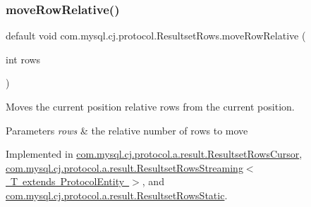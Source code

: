 \mbox{\label{interfacecom_1_1mysql_1_1cj_1_1protocol_1_1_resultset_rows_a81d7635ad38c59a3160e3edc46327bac}} 
\subsubsection{\texorpdfstring{move\+Row\+Relative()}{moveRowRelative()}}
{\footnotesize\ttfamily default void com.\+mysql.\+cj.\+protocol.\+Resultset\+Rows.\+move\+Row\+Relative (\begin{DoxyParamCaption}\item[{int}]{rows }\end{DoxyParamCaption})}

Moves the current position relative \textquotesingle{}rows\textquotesingle{} from the current position.


\begin{DoxyParams}{Parameters}
{\em rows} & the relative number of rows to move \\
\hline
\end{DoxyParams}


Implemented in \mbox{\hyperlink{classcom_1_1mysql_1_1cj_1_1protocol_1_1a_1_1result_1_1_resultset_rows_cursor_af4a1433311e5089d29b554c81d0b006c}{com.\+mysql.\+cj.\+protocol.\+a.\+result.\+Resultset\+Rows\+Cursor}}, \mbox{\hyperlink{classcom_1_1mysql_1_1cj_1_1protocol_1_1a_1_1result_1_1_resultset_rows_streaming_a737e87ca2de64978c94ecd245f1b9cf4}{com.\+mysql.\+cj.\+protocol.\+a.\+result.\+Resultset\+Rows\+Streaming$<$ T extends Protocol\+Entity $>$}}, and \mbox{\hyperlink{classcom_1_1mysql_1_1cj_1_1protocol_1_1a_1_1result_1_1_resultset_rows_static_ac6527b7e8cbc7cb3ec0c67c854f145b7}{com.\+mysql.\+cj.\+protocol.\+a.\+result.\+Resultset\+Rows\+Static}}.

\mbox{\label{interfacecom_1_1mysql_1_1cj_1_1protocol_1_1_resultset_rows_a813efe790e18424a02b692a3f9213446}} 
